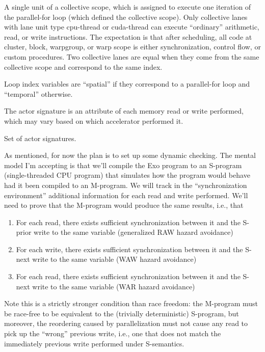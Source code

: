 \filbreak
{} A single unit of a collective scope, which is assigned to execute one iteration of the parallel-for loop (which defined the collective scope).
Only collective lanes with lane unit type cpu-thread or cuda-thread can execute ``ordinary'' arithmetic, read, or write instructions.
The expectation is that after scheduling, all code at cluster, block, warpgroup, or warp scope is either synchronization, control flow, or custom procedures.
Two collective lanes are equal when they come from the same collective scope and correspond to the same index.

\filbreak
{} Loop index variables are ``spatial'' if they correspond to a parallel-for loop and ``temporal'' otherwise.

\filbreak
{}
The actor signature is an attribute of each memory read or write performed, which may vary based on which accelerator performed it.

\filbreak
{}
Set of actor signatures.

\filbreak
{}

As mentioned, for now the plan is to set up some dynamic checking.
The mental model I'm accepting is that we'll compile the Exo program to an S-program (single-threaded CPU program) that simulates how the program would behave had it been compiled to an M-program.
We will track in the ``synchronization environment'' additional information for each read and write performed.
We'll need to prove that the M-program would produce the same results, i.e., that
\begin{enumerate}
  \item For each read, there exists sufficient synchronization between it and the S-prior write to the same variable (generalized RAW hazard avoidance)
  \item For each write, there exists sufficient synchronization between it and the S-next write to the same variable (WAW hazard avoidance)
  \item For each read, there exists sufficient synchronization between it and the S-next write to the same variable (WAR hazard avoidance)
\end{enumerate}

\filbreak
Note this is a strictly stronger condition than race freedom: the M-program must be race-free to be equivalent to the (trivially deterministic) S-program, but moreover, the reordering caused by parallelization must not cause any read to pick up the ``wrong'' previous write, i.e., one that does not match the immediately previous write performed under S-semantics.

